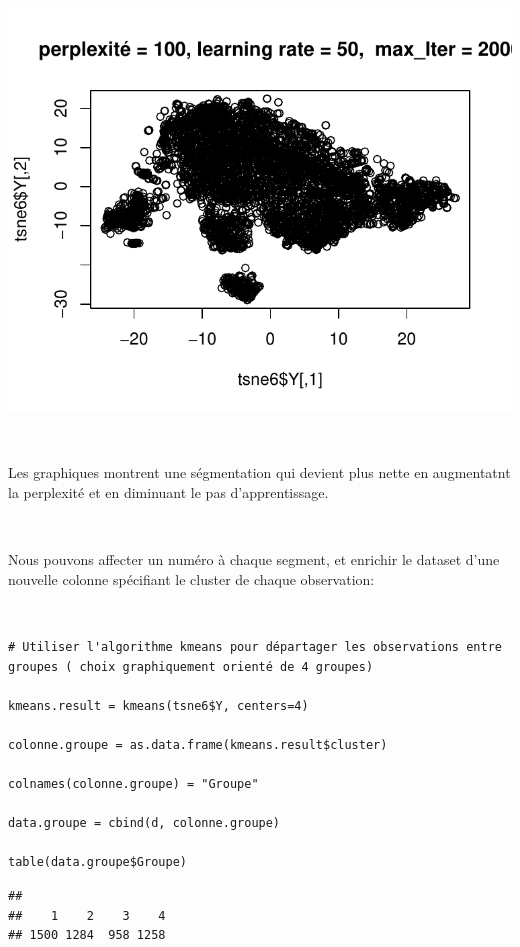 \documentclass[]{imsart}
\numberwithin{equation}{section}
\theoremstyle{plain}
\begin{document}
\begin{flushleft}\includegraphics{Analyse_Exploratoire_Projet_files/figure-latex/unnamed-chunk-20-6} \end{flushleft}

~

Les graphiques montrent une ségmentation qui devient plus nette en augmentatnt la perplexité et en diminuant le pas d'apprentissage.

~

Nous pouvons affecter un numéro à chaque segment, et enrichir le dataset d'une nouvelle colonne spécifiant le cluster de chaque observation:

~

\begin{verbatim}
# Utiliser l'algorithme kmeans pour départager les observations entre groupes ( choix graphiquement orienté de 4 groupes)

kmeans.result = kmeans(tsne6$Y, centers=4)

colonne.groupe = as.data.frame(kmeans.result$cluster)

colnames(colonne.groupe) = "Groupe"

data.groupe = cbind(d, colonne.groupe)

table(data.groupe$Groupe)
\end{verbatim}

\begin{verbatim}
## 
##    1    2    3    4 
## 1500 1284  958 1258
\end{verbatim}

~
\end{document}
